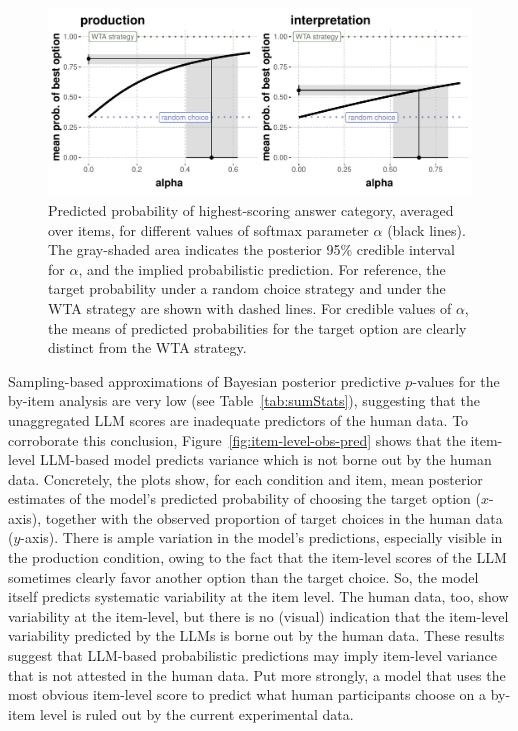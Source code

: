 \documentclass[fleqn]{article}
\begin{document}
\begin{figure}[t]
  \centering
  \includegraphics[width=\textwidth]{00-pics/GPT-closeness-target-by-alpha-item-level.pdf}
  \caption{
    Predicted probability of highest-scoring answer category, averaged over items, for different values of softmax parameter $\alpha$ (black lines).
    The gray-shaded area indicates the posterior 95\% credible interval for $\alpha$, and the implied probabilistic prediction.
    For reference, the target probability under a random choice strategy and under the WTA strategy are shown with dashed lines.
    For credible values of $\alpha$, the means of predicted probabilities for the target option are clearly distinct from the WTA strategy.
  }
  \label{fig:closeness-target-item-level}
\end{figure}

Sampling-based approximations of Bayesian posterior predictive $p$-values for the by-item analysis are very low (see Table~\ref{tab:sumStats}), suggesting that the unaggregated LLM scores are inadequate predictors of the human data.
To corroborate this conclusion, Figure~\ref{fig:item-level-obs-pred} shows that the item-level LLM-based model predicts variance which is not borne out by the human data.
Concretely, the plots show, for each condition and item, mean posterior estimates of the model's predicted probability of choosing the target option ($x$-axis), together with the observed proportion of target choices in the human data ($y$-axis).
There is ample variation in the model's predictions, especially visible in the production condition, owing to the fact that the item-level scores of the LLM sometimes clearly favor another option than the target choice.
So, the model itself predicts systematic variability at the item level.
The human data, too, show variability at the item-level, but there is no (visual) indication that the item-level variability predicted by the LLMs is borne out by the human data.
These results suggest that LLM-based probabilistic predictions may imply item-level variance that is not attested in the human data.
Put more strongly, a model that uses the most obvious item-level score to predict what human participants choose on a by-item level is ruled out by the current experimental data.
\end{document}
